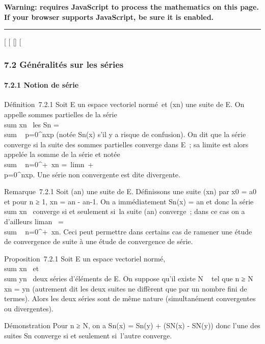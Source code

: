 \textbf{Warning: 
requires JavaScript to process the mathematics on this page.\\ If your
browser supports JavaScript, be sure it is enabled.}

\begin{center}\rule{3in}{0.4pt}\end{center}

{[}
{[}
{[}{]}
{[}

\subsubsection{7.2 Généralités sur les séries}

\paragraph{7.2.1 Notion de série}

Définition~7.2.1 Soit E un espace vectoriel normé~et (xn) une
suite de E. On appelle sommes partielles de la série
\\sum  xn~ les
Sn = \\sum ~
p=0^nxp (notée Sn(x) s'il y a risque
de confusion). On dit que la série converge si la suite des sommes
partielles converge dans E~; sa limite est alors appelée la somme de la
série et notée \\sum ~
n=0^+\infty~xn =\
limn\rightarrow~+\infty~\\\sum
 p=0^nxp. Une série non convergente est
dite divergente.

Remarque~7.2.1 Soit (an) une suite de E. Définissons une suite
(xn) par x0 = a0 et pour n ≥ 1,
xn = an - an-1. On a immédiatement
Sn(x) = an et donc la série
\\sum  xn~
converge si et seulement si~la suite (an) converge~; dans ce
cas on a d'ailleurs liman~
= \\sum ~
n=0^+\infty~xn. Ceci peut permettre dans certains cas
de ramener une étude de convergence de suite à une étude de convergence
de série.

Proposition~7.2.1 Soit E un espace vectoriel normé,
\\sum  xn~ et
\\sum  yn~ deux
séries d'éléments de E. On suppose qu'il existe N \in {}~ tel que n ≥ N \rigtharrow~
xn = yn (autrement dit les deux suites ne diffèrent
que par un nombre fini de termes). Alors les deux séries sont de même
nature (simultanément convergentes ou divergentes).

Démonstration Pour n ≥ N, on a Sn(x) = Sn(y) +
(SN(x) - SN(y)) donc l'une des suites Sn
converge si et seulement si~l'autre converge.

